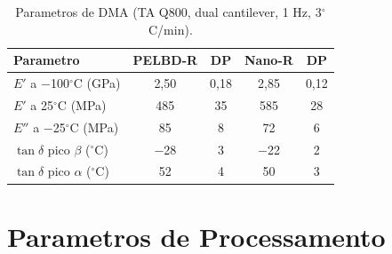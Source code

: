\documentclass[11pt,a4paper]{article}
\begin{document}
\begin{table}[H]\centering
\caption{Parametros de DMA (TA Q800, dual cantilever, 1 Hz, 3$^{\circ}$C/min).}\label{tab:dma}
\begin{tabular}{lcccc}
\toprule
{\bfseries Parametro} & {\bfseries PELBD-R} & {\bfseries DP} & {\bfseries Nano-R} & {\bfseries DP} \\
\midrule
$E'$ a $-$100$^{\circ}$C (GPa) & 2,50 & 0,18 & 2,85 & 0,12 \\
$E'$ a 25$^{\circ}$C (MPa) & 485 & 35 & 585 & 28 \\
$E''$ a $-$25$^{\circ}$C (MPa) & 85 & 8 & 72 & 6 \\
$\tan\delta$ pico $\beta$ ($^{\circ}$C) & $-$28 & 3 & $-$22 & 2 \\
$\tan\delta$ pico $\alpha$ ($^{\circ}$C) & 52 & 4 & 50 & 3 \\
\bottomrule
\end{tabular}
\end{table}

\section{Parametros de Processamento}
\end{document}

